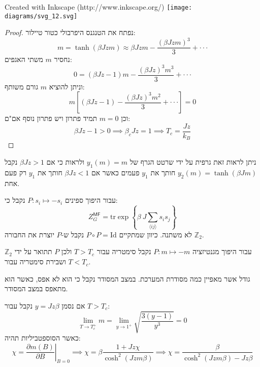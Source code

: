 \documentclass{tstextbook}
\begin{document}
 Created with Inkscape (http://www.inkscape.org/) \texttt{[image: diagrams/svg\_12.svg]}
\begin{proof}
נפתח את הטנגנס היפרבולי כטור טיילור:
$$m=\operatorname{tanh}(\beta J z m)\approx\beta J z m-\frac{(\beta J z m)^{3}}{3}+\cdot\cdot\cdot$$
נחסיר \(m\) משתי האגפים:
$$0=(\beta J z-1)m-\frac{(\beta J z)^{3}m^{3}}{3}+\cdot\cdot\cdot$$
וניתן להוציא \(m\) גורם משותף:
$$m\left[(\beta J z-1)-\frac{(\beta J z)^{3}m^{2}}{3}+\cdot\cdot\cdot\right]=0$$
וכן \(m=0\) תמיד פתרון ויש פתרון נוסף אם"ם:
$$\beta Jz-1> 0\implies \beta_{c}Jz=1\implies T_{c}=\frac{Jz}{k_{B}}$$

\end{proof}
\begin{remark}
ניתן לראות זאת גרפית על ידי שרטט הגרף של \(y_{1}(m)=m\) ולראות כי אם \(\beta Jz> 1\) נקבל \(y_{2}(m)=\tanh\left( \beta Jm \right)\) חותך את \(y_{1}\) פעמים כאשר אם \(\beta Jz<1\) חותך את \(y_{1}\) רק פעם אחת.

\end{remark}
\begin{remark}
עבור היפוך ספינים \(P:s_{i}\mapsto -s_{i}\) נקבל כי:
$$Z_{G}^{\mathsf{M F}}={\mathrm{tr}}\exp\left\{\beta\:J\sum_{\langle i j\rangle}s_{i}s_{j}\right\}$$
לא משתנה. כיוון שמתקיים \(P\circ P = \mathrm{Id}\) נקבל ש-\(P\) יוצרת את החבורה \(\mathbb{Z}_{2}\).

\end{remark}
\begin{proposition}
עבור היפוך מגנטיזציה \(P:m\mapsto -m\) נקבל סימטריה עבור \(T> T_{c}\) ולכן \(P\) תתואר על ידי \(\mathbb{Z}_{2}\) ושבירת סימטריה עבור \(T<T_{c}\).

\end{proposition}
\begin{definition}
גודל אשר מאפיין כמה מסודרת המערכת. במצב המסודר נקבל כי הוא לא אפס, כאשר הוא מתאפס במצב המסודר.

\end{definition}
\begin{proposition}
אם נסמן \(y=Jz\beta\) נקבל עבור \(T> T_{c}\):
$$\operatorname*{lim}_{T\rightarrow T_{c}^{+}}m=\operatorname*{lim}_{y\rightarrow1^{+}}\sqrt{\frac{3\left(y-1\right)}{y^{3}}}=0$$
כאשר הסוספטביליות תהיה:
$$\chi=\left.\frac{\partial m\left(B\right)}{\partial B}\right|_{B=0}\implies\chi=\beta\frac{1+J z\chi}{\cosh^{2}\left(J z m\beta\right)}\implies\chi=\frac{\beta}{\cosh^{2}\left(J z m\beta\right)-J z\beta}$$

\end{proposition}
\end{document}
